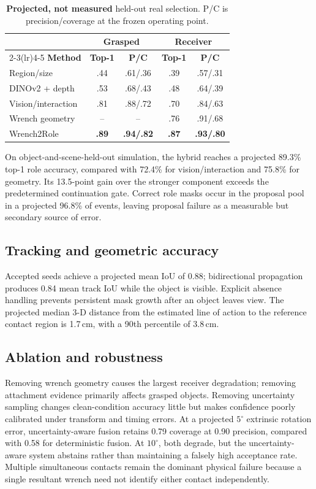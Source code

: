 \documentclass[letterpaper,10pt,journal,twoside]{IEEEtran}
\newcommand{\method}{Wrench2Role}
\begin{document}
\begin{table}[t]
\centering
\caption{\textbf{Projected, not measured} held-out real selection. P/C is
precision/coverage at the frozen operating point.}
\label{tab:real}
\setlength{\tabcolsep}{3.5pt}
\begin{tabular}{lcccc}
\toprule
& \multicolumn{2}{c}{\textbf{Grasped}} &
\multicolumn{2}{c}{\textbf{Receiver}} \\
\cmidrule(lr){2-3}\cmidrule(lr){4-5}
\textbf{Method} & \textbf{Top-1} & \textbf{P/C} &
\textbf{Top-1} & \textbf{P/C} \\
\midrule
Region/size & .44 & .61/.36 & .39 & .57/.31 \\
DINOv2 + depth & .53 & .68/.43 & .48 & .64/.39 \\
Vision/interaction & .81 & .88/.72 & .70 & .84/.63 \\
Wrench geometry & -- & -- & .76 & .91/.68 \\
\method{} & \textbf{.89} & \textbf{.94/.82} &
\textbf{.87} & \textbf{.93/.80} \\
\bottomrule
\end{tabular}
\end{table}

On object-and-scene-held-out simulation, the hybrid reaches a projected 89.3\%
top-1 role accuracy, compared with 72.4\% for vision/interaction and 75.8\% for
geometry. Its 13.5-point gain over the stronger component exceeds the
predetermined continuation gate. Correct role masks occur in the proposal pool
in a projected 96.8\% of events, leaving proposal failure as a measurable but
secondary source of error.

\subsection{Tracking and geometric accuracy}

Accepted seeds achieve a projected mean IoU of 0.88; bidirectional propagation
produces 0.84 mean track IoU while the object is visible. Explicit absence
handling prevents persistent mask growth after an object leaves view. The
projected median 3-D distance from the estimated line of action to the reference
contact region is 1.7\,cm, with a 90th percentile of 3.8\,cm.

\subsection{Ablation and robustness}

Removing wrench geometry causes the largest receiver degradation; removing
attachment evidence primarily affects grasped objects. Removing uncertainty
sampling changes clean-condition accuracy little but makes confidence poorly
calibrated under transform and timing errors. At a projected $5^\circ$
extrinsic rotation error, uncertainty-aware fusion retains 0.79 coverage at
0.90 precision, compared with 0.58 for deterministic fusion. At $10^\circ$,
both degrade, but the uncertainty-aware system abstains rather than maintaining
a falsely high acceptance rate. Multiple simultaneous contacts remain the
dominant physical failure because a single resultant wrench need not identify
either contact independently.
\end{document}
